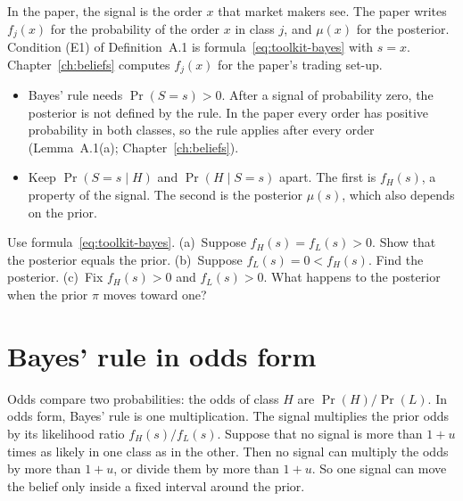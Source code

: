 In the paper, the signal is the order \(x\) that market makers see. The paper writes \(f_j(x)\) for the
probability of the order \(x\) in class \(j\), and \(\mu(x)\) for the posterior. Condition (E1) of
Definition~A.1 is formula~\eqref{eq:toolkit-bayes} with \(s=x\). Chapter~\ref{ch:beliefs} computes \(f_j(x)\) for
the paper's trading set-up.

\begin{watchout}
\begin{itemize}
\item Bayes' rule needs \(\Pr(S=s)>0\). After a signal of probability zero, the posterior is not defined by the
rule. In the paper every order has positive probability in both classes, so the rule applies after every order
(Lemma~A.1(a); Chapter~\ref{ch:beliefs}).
\item Keep \(\Pr(S=s\mid H)\) and \(\Pr(H\mid S=s)\) apart. The first is \(f_H(s)\), a property of the signal. The
second is the posterior \(\mu(s)\), which also depends on the prior.
\end{itemize}
\end{watchout}

\begin{checkyourself}\label{q:toolkit-bayes}
Use formula~\eqref{eq:toolkit-bayes}.
(a)~Suppose \(f_H(s)=f_L(s)>0\). Show that the posterior equals the prior.
(b)~Suppose \(f_L(s)=0<f_H(s)\). Find the posterior.
(c)~Fix \(f_H(s)>0\) and \(f_L(s)>0\). What happens to the posterior when the prior \(\pi\) moves toward one?
\end{checkyourself}

\section{Bayes' rule in odds form}\label{sec:toolkit-odds}

\begin{intuition}
Odds compare two probabilities: the odds of class \(H\) are \(\Pr(H)/\Pr(L)\). In odds form, Bayes' rule is one
multiplication. The signal multiplies the prior odds by its likelihood ratio \(f_H(s)/f_L(s)\). Suppose that no
signal is more than \(1+u\) times as likely in one class as in the other. Then no signal can multiply the odds by
more than \(1+u\), or divide them by more than \(1+u\). So one signal can move the belief only inside a fixed
interval around the prior.
\end{intuition}

